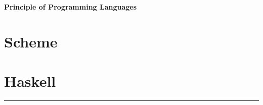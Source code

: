 




\raggedright
\footnotesize
\begin{multicols}{3}
\setlength{\premulticols}{1pt}
\setlength{\postmulticols}{1pt}
\setlength{\multicolsep}{1pt}
\setlength{\columnsep}{2pt}

{\Large{\textbf{Principle of Programming Languages}}}

\section{Scheme}



\section{Haskell}



\rule{0.3\linewidth}{0.25pt}
\end{multicols}
